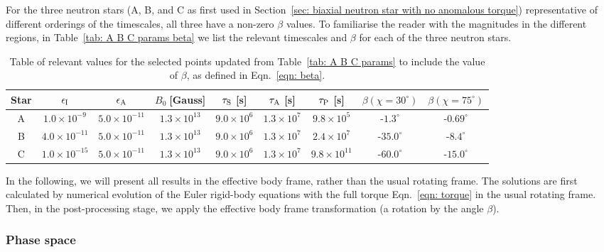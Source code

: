\documentclass[../full_thesis/full_thesis.tex]{subfiles}
\begin{document}
For the three neutron stars (A, B, and C as first used in Section~\ref{sec:
biaxial neutron star with no anomalous torque}) representative of different orderings of
the timescales, all three have a non-zero $\beta$ values. To familiarise the
reader with the magnitudes in the different regions, in Table~\ref{tab: A B C
params beta} we list the relevant timescales and $\beta$ for each of the three
neutron stars.
\begin{table}[ht]
{\footnotesize
\centering
\tabcolsep=0.11cm
	\begin{tabular}[ht]{|c|c|c|c|c|c|c|c|c|}\hline
Star &  $\epsilon_{\mathrm{I}}$  & $\epsilon_{\mathrm{A}} $ & 	$B_{0} \; $[Gauss] & $\tau_{\mathrm{S}}$ [s] & $\tau_{\mathrm{A}}$ [s] & $ \tau_{\mathrm{P}}$  [s] & $\beta (\chi=30^{\circ})$ & $\beta(\chi=75^{\circ})$ \\ \hline
A & $ {1.0}{\times} 10^{-9} $ & $ {5.0}{\times} 10^{-11} $ & $ {1.3}{\times} 10^{13} $ & $ {9.0}{\times} 10^{6} $ & $ {1.3}{\times} 10^{7} $ & $ {9.8}{\times} 10^{5} $ & $ \text{-}1.3^{\circ} $& $ \text{-}0.69^{\circ} $ \\
B & $ {4.0}{\times} 10^{-11} $ & $ {5.0}{\times} 10^{-11} $ & $ {1.3}{\times} 10^{13} $ & $ {9.0}{\times} 10^{6} $ & $ {1.3}{\times} 10^{7} $ & $ {2.4}{\times} 10^{7} $ & $ \text{-}35.0^{\circ} $& $ \text{-}8.4^{\circ} $ \\
C & $ {1.0}{\times} 10^{-15} $ & $ {5.0}{\times} 10^{-11} $ & $ {1.3}{\times} 10^{13} $ & $ {9.0}{\times} 10^{6} $ & $ {1.3}{\times} 10^{7} $ & $ {9.8}{\times} 10^{11} $ & $ \text{-}60.0^{\circ} $& $ \text{-}15.0^{\circ} $ \\ \hline
\end{tabular}}
\caption{Table of relevant values for the selected points updated from
Table~\ref{tab: A B C params} to include the value of $\beta$, as defined in
Eqn.~\eqref{eqn: beta}.}
\label{tab: A B C params beta}
\end{table}

In the following, we will present all results in the effective body frame,
rather than the usual rotating frame. The solutions are first calculated by
numerical evolution of the Euler rigid-body equations with the full torque
Eqn.~\eqref{eqn: torque} in the usual rotating frame. Then, in the
post-processing stage, we apply the effective body frame transformation (a
rotation by the angle $\beta$).

\subsubsection{Phase space}
\end{document}
